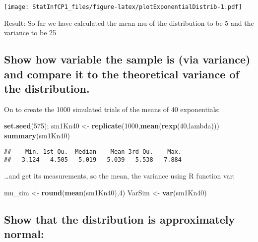 \documentclass[]{article}
\newenvironment{Shaded}{\begin{snugshade}}{\end{snugshade}}
\newcommand{\DecValTok}[1]{\textcolor[rgb]{0.00,0.00,0.81}{#1}}
\newcommand{\KeywordTok}[1]{\textcolor[rgb]{0.13,0.29,0.53}{\textbf{#1}}}
\newcommand{\NormalTok}[1]{#1}
\newcommand{\StringTok}[1]{\textcolor[rgb]{0.31,0.60,0.02}{#1}}
\begin{document}
\texttt{[image: StatInfCP1\_files/figure-latex/plotExponentialDistrib-1.pdf]}

Result: So far we have calculated the mean mu of the distribution to be
5 and the variance to be 25

\hypertarget{show-how-variable-the-sample-is-via-variance-and-compare-it-to-the-theoretical-variance-of-the-distribution.}{%
\subsection{Show how variable the sample is (via variance) and compare
it to the theoretical variance of the
distribution.}\label{show-how-variable-the-sample-is-via-variance-and-compare-it-to-the-theoretical-variance-of-the-distribution.}}

On to create the 1000 simulated trials of the means of 40 exponentials:

\begin{Shaded}
\begin{Highlighting}[]
\KeywordTok{set.seed}\NormalTok{(}\DecValTok{575}\NormalTok{);}
\NormalTok{sm1Kn40 <-}\StringTok{ }\KeywordTok{replicate}\NormalTok{(}\DecValTok{1000}\NormalTok{,}\KeywordTok{mean}\NormalTok{(}\KeywordTok{rexp}\NormalTok{(}\DecValTok{40}\NormalTok{,lambda)))}
\KeywordTok{summary}\NormalTok{(sm1Kn40)}
\end{Highlighting}
\end{Shaded}

\begin{verbatim}
##    Min. 1st Qu.  Median    Mean 3rd Qu.    Max. 
##   3.124   4.505   5.019   5.039   5.538   7.884
\end{verbatim}

\ldots and get its measurements, so the mean, the variance using R
function var:

\begin{Shaded}
\begin{Highlighting}[]
\NormalTok{mu_sim <-}\StringTok{ }\KeywordTok{round}\NormalTok{(}\KeywordTok{mean}\NormalTok{(sm1Kn40),}\DecValTok{4}\NormalTok{)}
\NormalTok{VarSim <-}\StringTok{ }\KeywordTok{var}\NormalTok{(sm1Kn40)}
\end{Highlighting}
\end{Shaded}

\hypertarget{show-that-the-distribution-is-approximately-normal}{%
\subsection{Show that the distribution is approximately
normal:}\label{show-that-the-distribution-is-approximately-normal}}
\end{document}
